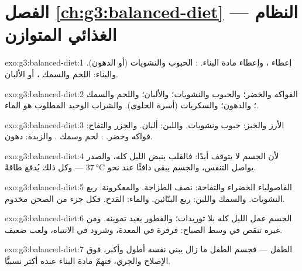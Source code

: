 \section*{الفصل \ref{ch:g3:balanced-diet} --- النظام الغذائي المتوازن}

\begin{solution}{exo:g3:balanced-diet:1}
إعطاء ، وإعطاء مادة البناء. : الحبوب والنشويات (أو
الدهون). والبناء: اللحم والسمك ، أو الألبان.
\end{solution}

\begin{solution}{exo:g3:balanced-diet:2}
الفواكه والخضر؛ والحبوب والنشويات؛ والألبان؛ واللحم والسمك
؛ والدهون؛ والسكريات (أسرة الحلوى). والشراب الوحيد المطلوب
هو الماء.
\end{solution}

\begin{solution}{exo:g3:balanced-diet:3}
الأرز والخبز: حبوب ونشويات. واللبن: ألبان. والجزر والتفاح: فواكه
وخضر. : لحم وسمك . والزبدة: دهون.
\end{solution}

\begin{solution}{exo:g3:balanced-diet:4}
لأن الجسم لا يتوقف أبدًا: فالقلب ينبض الليل كله، والصدر يواصل
التنفس، والجسم يبقى دافئًا عند نحو
$\qty{37}{\degreeCelsius}$ --- وكل ذلك يُدفع طاقةً.
\end{solution}

\begin{solution}{exo:g3:balanced-diet:5}
الفاصولياء الخضراء والتفاحة: نصف الطزاجة. والمعكرونة: ربع
النشويات. والسمك واللبن: ربع البنّائين. والماء: القدح. فكل جزء من
الصحن مخدوم.
\end{solution}

\begin{solution}{exo:g3:balanced-diet:6}
الجسم عمل الليل كله بلا توريدات؛ والفطور يعيد تموينه. ومن غيره
تنقص  في وسط الصباح: قرقرة في المعدة، وشرود في الانتباه،
ولعب ضعيف.
\end{solution}

\begin{solution}{exo:g3:balanced-diet:7}
الطفل --- فجسم الطفل ما زال يبني نفسه أطول وأكبر، فوق الإصلاح
والجري، فتهمّ مادة البناء عنده أكثر نسبيًّا.
\end{solution}

